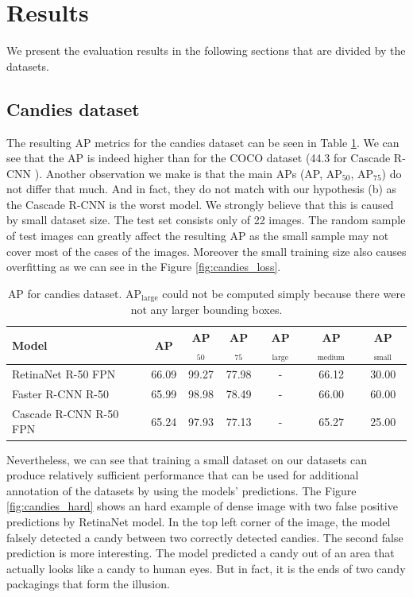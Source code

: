 \section{Results}
We present the evaluation results in the following sections that are divided by
the datasets.

\subsection{Candies dataset}
The resulting AP metrics for the candies dataset can be seen in Table
\ref{tab:candies}. We can see that the AP is indeed higher than for the COCO
dataset (44.3 for Cascade R-CNN \cite{detectron}). Another observation we make
is that the main APs (AP, AP$_{50}$, AP$_{75}$) do not differ that much. And
in fact, they do not match with our hypothesis (b) as the Cascade R-CNN is the
worst model. We strongly believe that this is caused by small dataset size. The
test set consists only of 22 images. The random sample of test images can
greatly affect the resulting AP as the small sample may not cover most of the
cases of the images. Moreover the small training size also causes overfitting
as we can see in the Figure \ref{fig:candies_loss}.

\begin{table}[H]
	\centering
	\begin{tabular}{l|c|c|c|c|c|c}
		Model                  & AP    & AP$_{50}$ & AP$_{75}$ & AP$_\text{large}$ & AP$_\text{medium}$ & AP$_\text{small}$ \\
		\hline
		RetinaNet R-50 FPN     & 66.09 & 99.27     & 77.98     & -                 & 66.12              & 30.00             \\
		Faster R-CNN R-50      & 65.99 & 98.98     & 78.49     & -                 & 66.00              & 60.00             \\
		Cascade R-CNN R-50 FPN & 65.24 & 97.93     & 77.13     & -                 & 65.27              & 25.00
	\end{tabular}
	\caption{AP for candies dataset. AP$_\text{large}$ could not be computed
		simply because there were not any larger bounding boxes.}
	\label{tab:candies}
\end{table}
Nevertheless, we can see that training a small dataset on our datasets can
produce relatively sufficient performance that can be used for additional
annotation of the datasets by using the models' predictions. The Figure
\ref{fig:candies_hard} shows an hard example of dense image with two false
positive predictions by RetinaNet model. In the top left corner of the image,
the model falsely detected a candy between two correctly detected candies. The
second false prediction is more interesting. The model predicted a candy out of
an area that actually looks like a candy to human eyes. But in fact, it is
the ends of two candy packagings that form the illusion.

